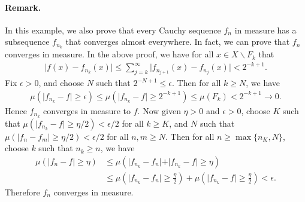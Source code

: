 \documentclass{article}
\begin{document}
\paragraph{Remark.} In this example, we also prove that every Cauchy sequence $f_n$ in measure has a subsequence $f_{n_k}$ that converges almost everywhere. In fact, we can prove that $f_n$ converges in measure. In the above proof, we have for all $x\in X\backslash F_k$ that
\begin{align*}
	\vert f(x) - f_{n_k}(x)\vert \leq \sum_{j=k}^\infty  \vert f_{n_{j+1}}(x) - f_{n_j}(x)\vert < 2^{-k+1}.
\end{align*}
Fix $\epsilon>0$, and choose $N$ such that $2^{-N+1}\leq\epsilon$. Then for all $k\geq N$, we have
\begin{align*}
	\mu(\vert f_{n_k}-f\vert \geq\epsilon) \leq \mu(\vert f_{n_k}-f\vert \geq 2^{-k+1}) \leq \mu(F_k) < 2^{-k+1}\to 0.
\end{align*}
Hence $f_{n_k}$ converges in measure to $f$. Now given $\eta > 0$ and $\epsilon >0$, choose $K$ such that $\mu(\vert f_{n_k}-f\vert \geq\eta/2) < \epsilon/2$ for all $k\geq K$, and $N$ such that $\mu(\vert f_{n}-f_m\vert \geq\eta/2) < \epsilon/2$ for all $n,m\geq N$. Then for all $n\geq\max\{n_K,N\}$, choose $k$ such that $n_k\geq n$, we have
\begin{align*}
	\mu(\vert f_n - f\vert \geq \eta) &\leq \mu(\vert f_{n_k} - f_n\vert + \vert f_{n_k} - f\vert \geq \eta)\\
	&\leq \mu\left(\vert f_{n_k} - f_n\vert \geq \frac{\eta}{2}\right) + \mu\left(\vert f_{n_k} - f\vert \geq \frac{\eta}{2}\right) < \epsilon.
\end{align*}
Therefore $f_n$ converges in measure.
\end{document}
